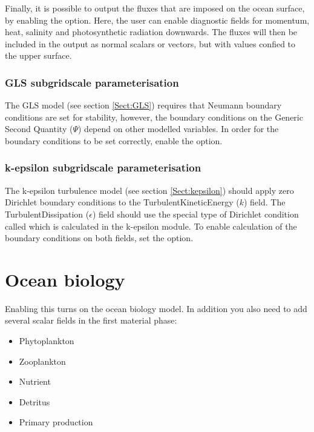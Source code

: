 Finally, it is possible to output the fluxes that are imposed on the ocean surface, by enabling the
 option. Here, the user can enable diagnostic fields for momentum, heat, salinity and
photosynthetic radiation downwards. The fluxes will then be included in the output as normal scalars or vectors, but with values
confied to the upper surface.

\subsubsection{GLS subgridscale parameterisation}\label{Sect:BCs:special:gls}

The GLS model (see section \ref{Sect:GLS}) requires that Neumann boundary
conditions are set for stability, however, the boundary conditions on the
Generic Second Quantity ($\Psi$) depend on other modelled variables. In
order for the boundary conditions to be set correctly, enable the \linebreak
{}
option.

\subsubsection{k-epsilon subgridscale parameterisation}\label{Sect:BCs:special:kepsilon}

The k-epsilon turbulence model (see section \ref{Sect:kepsilon}) should apply zero Dirichlet boundary
conditions to the TurbulentKineticEnergy ($k$) field. The TurbulentDissipation ($\epsilon$) field
should use the special type of Dirichlet condition called  which is calculated in the
k-epsilon module. To enable calculation of the boundary conditions on both fields, set the \linebreak
{}
option.

\section{Ocean biology}

Enabling this turns on the ocean biology model. In addition you also need to add several scalar fields in the first material phase:
\begin{itemize}
\item Phytoplankton
\item Zooplankton
\item Nutrient
\item Detritus
\item Primary production
\end{itemize}

